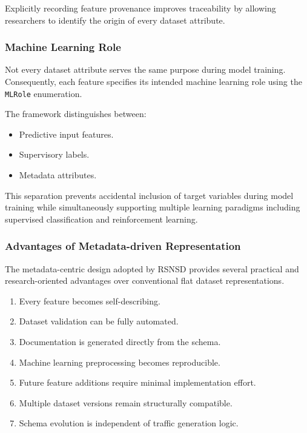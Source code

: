 \documentclass[12pt,a4paper]{article}
\begin{document}
Explicitly recording feature provenance improves traceability by allowing researchers to identify the origin of every dataset attribute.

\subsubsection{Machine Learning Role}

Not every dataset attribute serves the same purpose during model training. Consequently, each feature specifies its intended machine learning role using the \texttt{MLRole} enumeration.

The framework distinguishes between:

\begin{itemize}
	
	\item Predictive input features.
	
	\item Supervisory labels.
	
	\item Metadata attributes.
	
\end{itemize}

This separation prevents accidental inclusion of target variables during model training while simultaneously supporting multiple learning paradigms including supervised classification and reinforcement learning.

\subsubsection{Advantages of Metadata-driven Representation}

The metadata-centric design adopted by RSNSD provides several practical and research-oriented advantages over conventional flat dataset representations.

\begin{enumerate}
	
	\item Every feature becomes self-describing.
	
	\item Dataset validation can be fully automated.
	
	\item Documentation is generated directly from the schema.
	
	\item Machine learning preprocessing becomes reproducible.
	
	\item Future feature additions require minimal implementation effort.
	
	\item Multiple dataset versions remain structurally compatible.
	
	\item Schema evolution is independent of traffic generation logic.
	
\end{enumerate}
\end{document}
